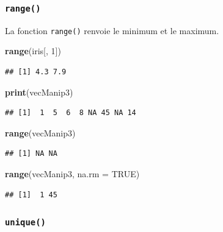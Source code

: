 \documentclass[
]{book}
\newenvironment{Shaded}{\begin{snugshade}}{\end{snugshade}}
\newcommand{\DataTypeTok}[1]{\textcolor[rgb]{0.13,0.29,0.53}{#1}}
\newcommand{\DecValTok}[1]{\textcolor[rgb]{0.00,0.00,0.81}{#1}}
\newcommand{\KeywordTok}[1]{\textcolor[rgb]{0.13,0.29,0.53}{\textbf{#1}}}
\newcommand{\NormalTok}[1]{#1}
\newcommand{\OtherTok}[1]{\textcolor[rgb]{0.56,0.35,0.01}{#1}}
\begin{document}
\hypertarget{l015range}{%
\subsubsection{\texorpdfstring{\texttt{range()}}{range()}}\label{l015range}}

La fonction \texttt{range()} renvoie le minimum et le maximum.

\begin{Shaded}
\begin{Highlighting}[]
\KeywordTok{range}\NormalTok{(iris[, }\DecValTok{1}\NormalTok{])}
\end{Highlighting}
\end{Shaded}

\begin{verbatim}
## [1] 4.3 7.9
\end{verbatim}

\begin{Shaded}
\begin{Highlighting}[]
\KeywordTok{print}\NormalTok{(vecManip3)}
\end{Highlighting}
\end{Shaded}

\begin{verbatim}
## [1]  1  5  6  8 NA 45 NA 14
\end{verbatim}

\begin{Shaded}
\begin{Highlighting}[]
\KeywordTok{range}\NormalTok{(vecManip3)}
\end{Highlighting}
\end{Shaded}

\begin{verbatim}
## [1] NA NA
\end{verbatim}

\begin{Shaded}
\begin{Highlighting}[]
\KeywordTok{range}\NormalTok{(vecManip3, }\DataTypeTok{na.rm =} \OtherTok{TRUE}\NormalTok{)}
\end{Highlighting}
\end{Shaded}

\begin{verbatim}
## [1]  1 45
\end{verbatim}

\hypertarget{l015unique}{%
\subsubsection{\texorpdfstring{\texttt{unique()}}{unique()}}\label{l015unique}}
\end{document}
